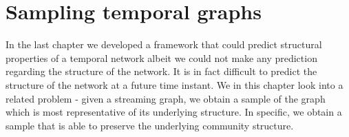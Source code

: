   \newenvironment{function7}[1][htb]
  {\renewcommand{\thealgocf}{7}
  \renewcommand{\algorithmcfname}{Function}%
   \begin{algorithm}
  }{\end{algorithm}}
  \newenvironment{function8}[1][htb]
  {\renewcommand{\thealgocf}{8}
  \renewcommand{\algorithmcfname}{Function}%
   \begin{algorithm}
  }{\end{algorithm}}



% 
% 
% 
% 


\chapter{Sampling temporal graphs}

In the last chapter we developed a framework that could predict structural properties of a temporal network albeit we could not make any prediction regarding the 
structure of the network. It is in fact difficult to predict the structure of the network at a future time instant. We in this chapter look into a related problem - 
given a streaming graph, we obtain a sample of the graph which is most representative of its underlying structure. 
In specific, we obtain a sample that is able to preserve the underlying community structure. 




%








%






%

\newpage
%
% 
%


